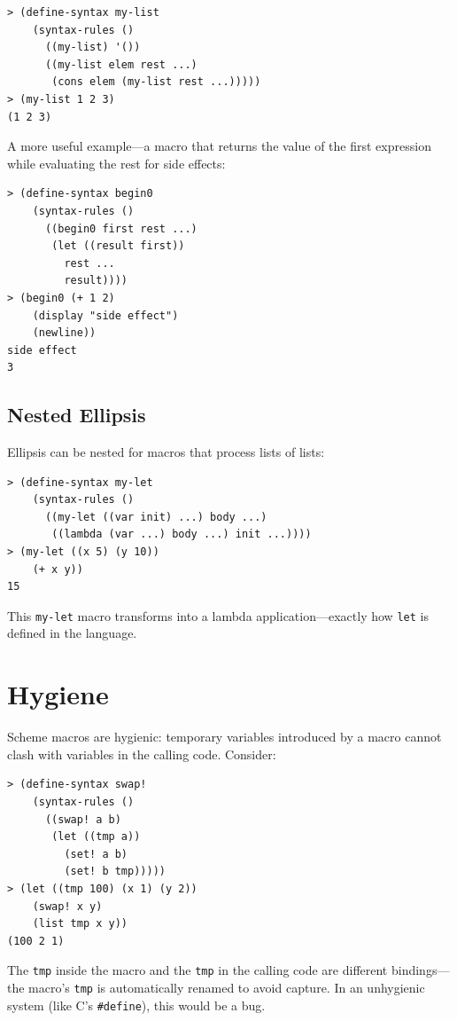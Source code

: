 \begin{lstlisting}[style=repl]
> (define-syntax my-list
    (syntax-rules ()
      ((my-list) '())
      ((my-list elem rest ...)
       (cons elem (my-list rest ...)))))
> (my-list 1 2 3)
(1 2 3)
\end{lstlisting}

A more useful example---a macro that returns the value of the first expression while evaluating the rest for side effects:

\begin{lstlisting}[style=repl]
> (define-syntax begin0
    (syntax-rules ()
      ((begin0 first rest ...)
       (let ((result first))
         rest ...
         result))))
> (begin0 (+ 1 2)
    (display "side effect")
    (newline))
side effect
3
\end{lstlisting}

\subsection{Nested Ellipsis}

Ellipsis can be nested for macros that process lists of lists:

\begin{lstlisting}[style=repl]
> (define-syntax my-let
    (syntax-rules ()
      ((my-let ((var init) ...) body ...)
       ((lambda (var ...) body ...) init ...))))
> (my-let ((x 5) (y 10))
    (+ x y))
15
\end{lstlisting}

This \texttt{my-let} macro transforms into a lambda application---exactly how \texttt{let} is defined in the language.

\section{Hygiene}
\label{sec:hygiene}

Scheme macros are hygienic: temporary variables introduced by a macro cannot clash with variables in the calling code. Consider:

\begin{lstlisting}[style=repl]
> (define-syntax swap!
    (syntax-rules ()
      ((swap! a b)
       (let ((tmp a))
         (set! a b)
         (set! b tmp)))))
> (let ((tmp 100) (x 1) (y 2))
    (swap! x y)
    (list tmp x y))
(100 2 1)
\end{lstlisting}

The \texttt{tmp} inside the macro and the \texttt{tmp} in the calling code are different bindings---the macro's \texttt{tmp} is automatically renamed to avoid capture. In an unhygienic system (like C's \texttt{\#define}), this would be a bug.

